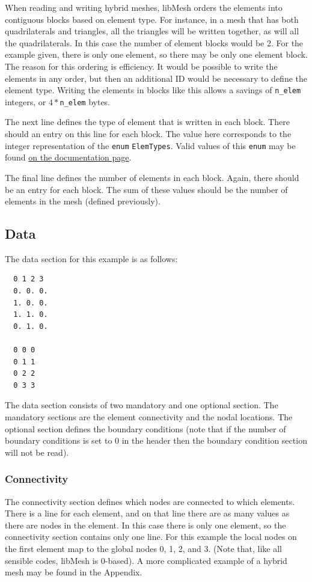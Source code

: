 \documentclass[12pt]{article}
\begin{document}
When reading and writing hybrid meshes, libMesh orders the elements into contiguous blocks based on element type.  For instance, in a mesh that has both quadrilaterals and triangles, all the triangles will be written together, as will all the quadrilaterals.  In this case the number of element blocks would be 2.  For the example given, there is only one element, so there may be only one element block.  The reason for this ordering is efficiency.  It would be possible to write the elements in any order, but then an additional ID would be necessary to define the element type.  Writing the elements in blocks like this allows a savings of \texttt{n\_elem} integers, or $4*$\texttt{n\_elem} bytes.

The next line defines the type of element that is written in each block.  There should an entry on this line for each block.  The value here corresponds to the integer representation of the \texttt{enum} \texttt{ElemTypes}.  Valid values of this \texttt{enum} may be found \href{http://libmesh.sourceforge.net/doxygen/namespacelibMeshEnums.html#a145}{on the documentation page}.

The final line defines the number of elements in each block.  Again, there should be an entry for each block.  The sum of these values should be the number of elements in the mesh (defined previously).

\subsection{Data}
The data section for this example is as follows:
\small
\begin{verbatim}
  0 1 2 3
  0. 0. 0. 
  1. 0. 0.
  1. 1. 0.
  0. 1. 0.
  
  0 0 0
  0 1 1
  0 2 2
  0 3 3
\end{verbatim}
\normalsize

The data section consists of two mandatory and one optional section.  The mandatory sections are the element connectivity and the nodal locations.  The optional section defines the boundary conditions (note that if the number of boundary conditions is set to 0 in the header then the boundary condition section will not be read).

\subsubsection{Connectivity}
The connectivity section defines which nodes are connected to which elements.  There is a line for each element, and on that line there are as many values as there are nodes in the element.  In this case there is only one element, so the connectivity section contains only one line.  For this example the local nodes on the first element map to the global nodes 0, 1, 2, and 3.  (Note that, like all sensible codes, libMesh is 0-based).  A more complicated example of a hybrid mesh may be found in the Appendix.
\end{document}
